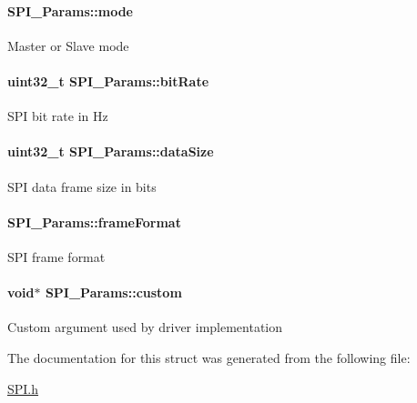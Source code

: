 \paragraph[{mode}]{ S\+P\+I\+\_\+\+Params\+::mode}\label{struct_s_p_i___params_abe5eca64adf4ca96bed206a271d9b157}
Master or Slave mode 
\paragraph[{bit\+Rate}]{\setlength{\rightskip}{0pt plus 5cm}uint32\+\_\+t S\+P\+I\+\_\+\+Params\+::bit\+Rate}\label{struct_s_p_i___params_ab3f035044fdbe75adac8c1d729d8cf20}
S\+P\+I bit rate in Hz 
\paragraph[{data\+Size}]{\setlength{\rightskip}{0pt plus 5cm}uint32\+\_\+t S\+P\+I\+\_\+\+Params\+::data\+Size}\label{struct_s_p_i___params_a30722b1de5e3b089ecf0c669da42ed2d}
S\+P\+I data frame size in bits 
\paragraph[{frame\+Format}]{ S\+P\+I\+\_\+\+Params\+::frame\+Format}\label{struct_s_p_i___params_a67b5ebb8ec72796a0260c427c91cc093}
S\+P\+I frame format 
\paragraph[{custom}]{\setlength{\rightskip}{0pt plus 5cm}void$\ast$ S\+P\+I\+\_\+\+Params\+::custom}\label{struct_s_p_i___params_a909f58a310514d16b4fee1b51033d976}
Custom argument used by driver implementation 

The documentation for this struct was generated from the following file\+:\begin{DoxyCompactItemize}
\item 
\hyperlink{_s_p_i_8h}{S\+P\+I.\+h}\end{DoxyCompactItemize}

